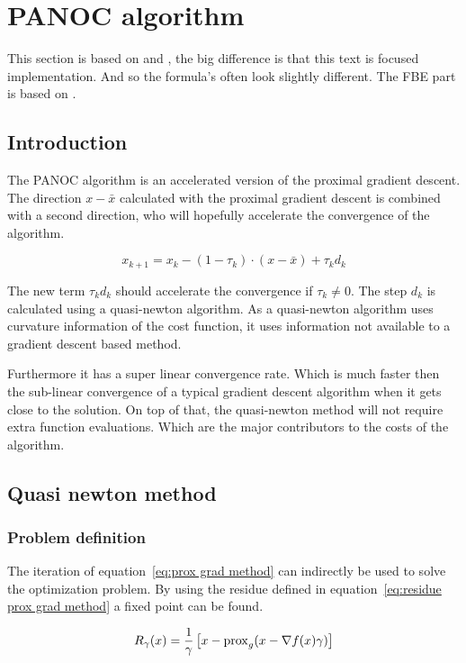 \section{PANOC algorithm}
	This section is based on \cite{LorenzoStella2017} and \cite{AjaySathya2017}, the big difference is that this text is focused implementation. And so the formula's often look slightly different. The FBE part is based on \cite{Themelis}.
	\subsection{Introduction}
		The PANOC algorithm is an accelerated version of the proximal gradient descent. The direction  $x-\bar{x}$ calculated with the proximal gradient descent  is combined with a second direction, who will hopefully accelerate the convergence of the algorithm.
		
		\begin{equation}
		x_{k+1} = x_k - (1-\tau_k)\cdot (x-\bar{x}) + \tau_k d_k
		\end{equation}
		
		The new term $\tau_kd_k$ should accelerate the convergence if $\tau_k\neq0$. The step $d_k$ is calculated using a quasi-newton algorithm. As a quasi-newton algorithm uses curvature information of the cost function, it uses information not available to a gradient descent based method. 
		
		Furthermore it has a super linear convergence rate. Which is much faster then the sub-linear convergence of a typical gradient descent algorithm when it gets close to the solution. On top of that, the quasi-newton method will not require extra function evaluations. Which are the major contributors to the costs of the algorithm.
		
	\subsection{Quasi newton method}
		\subsubsection{Problem definition}
			The iteration of equation~\ref{eq:prox grad method} can indirectly be used to solve the optimization problem.  By using the residue defined in equation~\ref{eq:residue prox grad method} a fixed point can be found. 
			
			\begin{equation}
			R_{\gamma}(x)= \frac{1}{\gamma}\left[ x - \operatorname{prox}_g( x - \nabla f(x)\gamma) \right]
			\label{eq:residue prox grad method}
			\end{equation}
			
